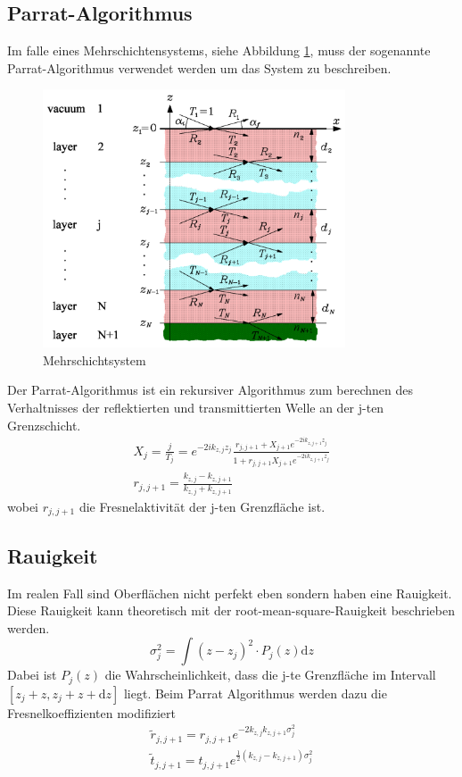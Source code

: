    \subsection{Parrat-Algorithmus}
        Im falle eines Mehrschichtensystems, siehe Abbildung \ref{fig:mehrschicht}, muss der sogenannte Parrat-Algorithmus verwendet werden um das System zu beschreiben.
        \begin{figure}[ht]
            \centering
            \includegraphics[width = 0.8\textwidth]{bilder/Mehrschichtsystem.png}
            \caption{Mehrschichtsystem}
            \label{fig:mehrschicht}
        \end{figure}
        Der Parrat-Algorithmus ist ein rekursiver Algorithmus zum berechnen des Verhaltnisses der reflektierten und transmittierten Welle an der j-ten Grenzschicht.
        \begin{align}
            X_j = \frac{j}{T_j} = e^{-2ik_{z,j}z_j} \frac{r_{j,j+1} + X_{j+1} e^{-2ik_{z,j+1}z_j}}{1 + r_{j,j+1}X_{j+1} e^{-2ik_{z,j+1}z_j}}\\
            r_{j,j+1} = \frac{k_{z,j} - k_{z,j+1}}{k_{z,j} + k_{z,j+1}}
        \end{align}
        wobei $r_{j,j+1}$ die Fresnelaktivität der j-ten Grenzfläche ist.
    \subsection{Rauigkeit}
        Im realen Fall sind Oberflächen nicht perfekt eben sondern haben eine Rauigkeit.
        Diese Rauigkeit kann theoretisch mit der root-mean-square-Rauigkeit beschrieben werden.
        \begin{equation}
            \sigma_j^2 = \int \left(z-z_j\right)^2\cdot P_j(z) \text{d}z        
        \end{equation}
        Dabei ist $P_j(z)$ die Wahrscheinlichkeit, dass die j-te Grenzfläche im Intervall $[z_j+z,z_j+z+\text{d}z]$ liegt.
        Beim Parrat Algorithmus werden dazu die Fresnelkoeffizienten modifiziert
        \begin{align}
            \tilde{r}_{j,j+1} = r_{j,j+1} e^{-2k_{z,j}k_{z,j+1} \sigma_j^2}\\
            \tilde{t}_{j,j+1} = t_{j,j+1} e^{ \frac{1}{2} \left(k_{z,j} -k_{z,j+1}\right)\sigma_j^2}
        \end{align}
